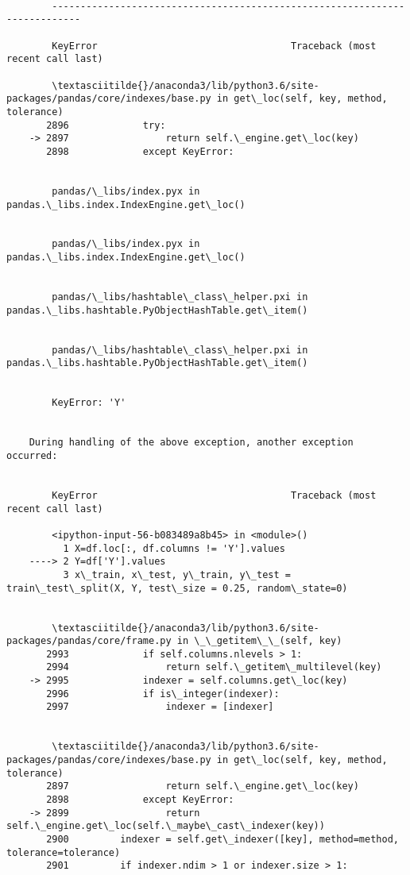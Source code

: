 \documentclass[11pt]{article}
\begin{document}
    \begin{Verbatim}[commandchars=\\\{\}]

        ---------------------------------------------------------------------------

        KeyError                                  Traceback (most recent call last)

        \textasciitilde{}/anaconda3/lib/python3.6/site-packages/pandas/core/indexes/base.py in get\_loc(self, key, method, tolerance)
       2896             try:
    -> 2897                 return self.\_engine.get\_loc(key)
       2898             except KeyError:


        pandas/\_libs/index.pyx in pandas.\_libs.index.IndexEngine.get\_loc()


        pandas/\_libs/index.pyx in pandas.\_libs.index.IndexEngine.get\_loc()


        pandas/\_libs/hashtable\_class\_helper.pxi in pandas.\_libs.hashtable.PyObjectHashTable.get\_item()


        pandas/\_libs/hashtable\_class\_helper.pxi in pandas.\_libs.hashtable.PyObjectHashTable.get\_item()


        KeyError: 'Y'

        
    During handling of the above exception, another exception occurred:


        KeyError                                  Traceback (most recent call last)

        <ipython-input-56-b083489a8b45> in <module>()
          1 X=df.loc[:, df.columns != 'Y'].values
    ----> 2 Y=df['Y'].values
          3 x\_train, x\_test, y\_train, y\_test = train\_test\_split(X, Y, test\_size = 0.25, random\_state=0)


        \textasciitilde{}/anaconda3/lib/python3.6/site-packages/pandas/core/frame.py in \_\_getitem\_\_(self, key)
       2993             if self.columns.nlevels > 1:
       2994                 return self.\_getitem\_multilevel(key)
    -> 2995             indexer = self.columns.get\_loc(key)
       2996             if is\_integer(indexer):
       2997                 indexer = [indexer]


        \textasciitilde{}/anaconda3/lib/python3.6/site-packages/pandas/core/indexes/base.py in get\_loc(self, key, method, tolerance)
       2897                 return self.\_engine.get\_loc(key)
       2898             except KeyError:
    -> 2899                 return self.\_engine.get\_loc(self.\_maybe\_cast\_indexer(key))
       2900         indexer = self.get\_indexer([key], method=method, tolerance=tolerance)
       2901         if indexer.ndim > 1 or indexer.size > 1:



\end{Verbatim}
\end{document}
